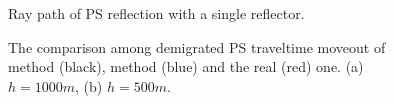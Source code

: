 \begin{figure}
   \centering
   \caption{Ray path of PS reflection with a single reflector.}
   \label{fig:PS_refl}
\end{figure}

\begin{figure}
   \centering
   \caption{The comparison among demigrated PS traveltime moveout of method \uppercase\expandafter{} (black), method 
   \uppercase\expandafter{} (blue) and the real (red) one.
   (a) $h=1000m$, (b) $h=500m$.}
   \label{fig:Sens_vp}
\end{figure}

